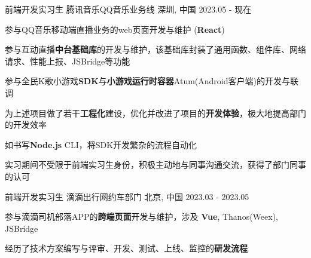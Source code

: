 

\begin{cventries}
    \cventry
    {前端开发实习生} %
    {腾讯音乐\hspace{2mm}QQ音乐业务线} %
    {深圳, 中国} %
    {2023.05 - 现在} %
    {
        \begin{cvitems} %
            \item {参与QQ音乐移动端直播业务的web页面开发与维护 (\textbf{React})}
            \item {参与互动直播\textbf{中台基础库}的开发与维护，该基础库封装了通用函数、组件库、网络请求、性能上报、JSBridge等功能}
            \item {参与全民K歌小游戏\textbf{SDK}与\textbf{小游戏运行时容器}Atum(Android客户端)的开发与联调}
            \item {为上述项目做了若干\textbf{工程化}建设，优化并改进了项目的\textbf{开发体验}，极大地提高部门的开发效率}
            \item {如书写\textbf{Node.js} CLI，将SDK开发繁杂的流程自动化}
            \item {实习期间不受限于前端实习生身份，积极主动地与同事沟通交流，获得了部门同事的认可}
        \end{cvitems}
    }

    \cventry
    {前端开发实习生} %
    {滴滴出行\hspace{2mm}网约车部门} %
    {北京, 中国} %
    {2023.03 - 2023.05} %
    {
        \begin{cvitems} %
            \item {参与滴滴司机部落APP的\textbf{跨端页面}开发与维护，涉及 \textbf{Vue}, Thanos(Weex), JSBridge }
            \item {经历了技术方案编写与评审、开发、测试、上线、监控的\textbf{研发流程}}
        \end{cvitems}
    }
\end{cventries}
